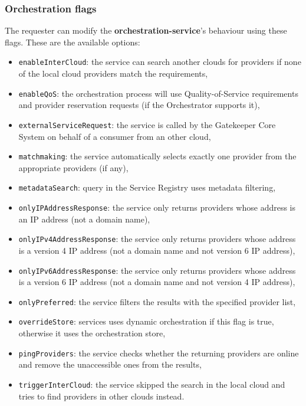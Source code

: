 \documentclass[a4paper]{arrowhead}
\begin{document}
\subsubsection{Orchestration flags}

The requester can modify the \textbf{orchestration-service}'s behaviour using these flags. These are the available options:

\begin{itemize}
    \item \texttt{enableInterCloud}: the service can search another clouds for providers if none of the local cloud providers match the requirements,
    \item \texttt{enableQoS}: the orchestration process will use Quality-of-Service requirements and provider reservation requests (if the Orchestrator supports it),
    \item \texttt{externalServiceRequest}: the service is called by the Gatekeeper Core System on behalf of a consumer from an other cloud,
    \item \texttt{matchmaking}: the service automatically selects exactly one provider from the appropriate providers (if any),
    \item \texttt{metadataSearch}: query in the Service Registry uses metadata filtering,
    \item \texttt{onlyIPAddressResponse}: the service only returns providers whose address is an IP address (not a domain name),
    \item \texttt{onlyIPv4AddressResponse}: the service only returns providers whose address is a version 4 IP address (not a domain name and not version 6 IP address),
    \item \texttt{onlyIPv6AddressResponse}: the service only returns providers whose address is a version 6 IP address (not a domain name and not version 4 IP address),
    \item \texttt{onlyPreferred}: the service filters the results with the specified provider list,
    \item \texttt{overrideStore}: services uses dynamic orchestration if this flag is true, otherwise it uses the orchestration store,
    \item \texttt{pingProviders}: the service checks whether the returning providers are online and remove the unaccessible ones from the results,
    \item \texttt{triggerInterCloud}: the service skipped the search in the local cloud and tries to find providers in other clouds instead.
\end{itemize}
\end{document}
